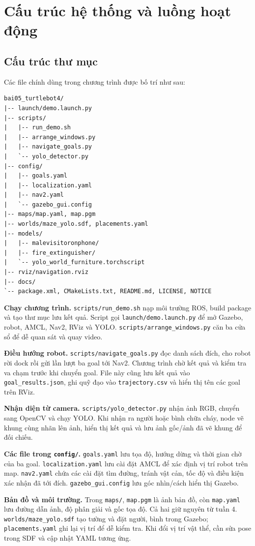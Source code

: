 \documentclass[a4paper,11pt]{article}
\newcommand{\code}[1]{\nolinkurl{#1}}
\begin{document}
\section{Cấu trúc hệ thống và luồng hoạt động}
\subsection{Cấu trúc thư mục}
Các file chính dùng trong chương trình được bố trí như sau:
\begin{Verbatim}
bai05_turtlebot4/
|-- launch/demo.launch.py
|-- scripts/
|   |-- run_demo.sh
|   |-- arrange_windows.py
|   |-- navigate_goals.py
|   `-- yolo_detector.py
|-- config/
|   |-- goals.yaml
|   |-- localization.yaml
|   |-- nav2.yaml
|   `-- gazebo_gui.config
|-- maps/map.yaml, map.pgm
|-- worlds/maze_yolo.sdf, placements.yaml
|-- models/
|   |-- malevisitoronphone/
|   |-- fire_extinguisher/
|   `-- yolo_world_furniture.torchscript
|-- rviz/navigation.rviz
|-- docs/
`-- package.xml, CMakeLists.txt, README.md, LICENSE, NOTICE
\end{Verbatim}

\textbf{Chạy chương trình.}
\code{scripts/run_demo.sh} nạp môi trường ROS, build package và tạo thư mục lưu
kết quả. Script gọi \code{launch/demo.launch.py} để mở Gazebo, robot, AMCL, Nav2,
RViz và YOLO. \code{scripts/arrange_windows.py} căn ba cửa sổ để dễ quan sát và quay video.

\textbf{Điều hướng robot.}
\code{scripts/navigate_goals.py} đọc danh sách đích, cho robot rời dock rồi gửi
lần lượt ba goal tới Nav2. Chương trình chờ kết quả và kiểm tra va chạm trước
khi chuyển goal. File này cũng lưu kết quả vào \code{goal_results.json}, ghi
quỹ đạo vào \code{trajectory.csv} và hiển thị tên các goal trên RViz.

\textbf{Nhận diện từ camera.}
\code{scripts/yolo_detector.py} nhận ảnh RGB, chuyển sang OpenCV và chạy YOLO.
Khi nhận ra người hoặc bình chữa cháy, node vẽ khung cùng nhãn lên ảnh,
hiển thị kết quả và lưu ảnh gốc/ảnh đã vẽ khung để đối chiếu.

\textbf{Các file trong \code{config/}.}
\code{goals.yaml} lưu tọa độ, hướng dừng và thời gian chờ của ba goal.
\code{localization.yaml} lưu cài đặt AMCL để xác định vị trí robot trên map.
\code{nav2.yaml} chứa các cài đặt tìm đường, tránh vật cản, tốc độ và điều kiện
xác nhận đã tới đích. \code{gazebo_gui.config} lưu góc nhìn/cách hiển thị Gazebo.

\textbf{Bản đồ và môi trường.}
Trong \code{maps/}, \code{map.pgm} là ảnh bản đồ, còn \code{map.yaml} lưu đường dẫn
ảnh, độ phân giải và gốc tọa độ. Cả hai giữ nguyên từ tuần 4.
\code{worlds/maze_yolo.sdf} tạo tường và đặt người, bình trong Gazebo;
\code{placements.yaml} ghi lại vị trí để dễ kiểm tra. Khi đổi vị trí vật thể,
cần sửa pose trong SDF và cập nhật YAML tương ứng.
\end{document}
